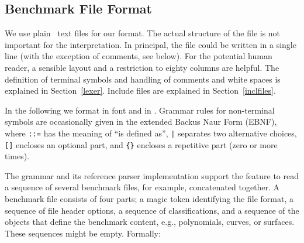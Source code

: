 \subsection{Benchmark File Format}

We use plain \ascii\ text files for our format. The actual structure
of the file is not important for the interpretation. In principal, the
file could be written in a single line (with the exception of
comments, see below). For the potential human reader, a sensible
layout and a restriction to eighty columns are helpful. The definition
of terminal symbols and handling of comments and white spaces is
explained in Section~\ref{lexer}. Include files are explained in
Section~\ref{inclfiles}. 

In the following we format  in
 font and  in .
Grammar rules for non-terminal symbols are occasionally given in the
extended Backus Naur Form (EBNF), where \texttt{::=} has the meaning
of ``is defined as'', \texttt{|} separates two alternative choices,
\texttt{[]} encloses an optional part, and \verb|{}| encloses a
repetitive part (zero or more times).

The grammar and its reference parser implementation support the
feature to read a sequence of several benchmark files, for example,
concatenated together.  A benchmark file consists of four parts; a
magic token identifying the file format, a sequence of file header
options, a sequence of classifications, and a sequence of the objects
that define the benchmark content, e.g., polynomials, curves, or
surfaces. These sequences might be empty. Formally:
\medskip

